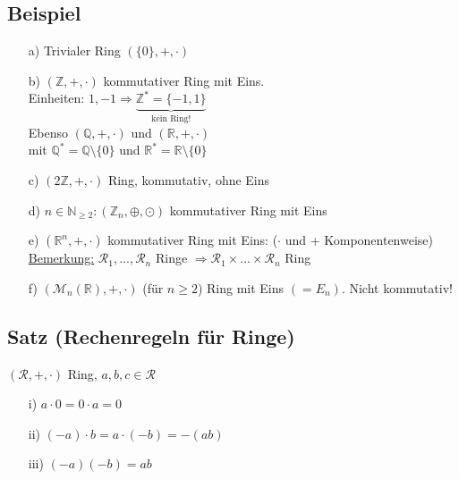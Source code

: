 \documentclass[a4paper, 12pt,titlepage, pdf, headsepline]{article}
\newcommand{\R}{\mathds{R}}
\newcommand{\uline}[1]{\underline{#1}}
\renewcommand{\>}{\rightarrow}
\renewcommand{\*}{\cdot}
\begin{document}
	      \subsection{Beispiel}
	      \label{4.2}
	      \begin{itemize}
	      	\item[a)] Trivialer Ring $(\{0\},+,\cdot)$
	      	\item[b)] $(\mathds{Z}, +,\cdot)$ kommutativer Ring mit Eins. \\
	      	      Einheiten: $1, -1\Rightarrow \underbrace{\mathds{Z}^* = \{-1,1\}}_{\text{kein Ring!}}$\\
	      	      Ebenso $(\mathds{Q},+,\cdot)$ und $(\mathds{R},+,\cdot)$ \\
	      	      mit $\mathds{Q}^* = \mathds{Q} \setminus \{0\}$ und $\mathds{R}^* =  \mathds{R} \setminus \{0\}$
	      	\item[c)] $(2\mathds{Z},+,\cdot)$ Ring, kommutativ, ohne Eins
	      	\item[d)] $n \in \mathds{N}_{\geq 2}: (\mathds{Z}_n, \oplus, \odot)$ kommutativer Ring mit Eins
	      	\item[e)] $(\R^n, + ,\cdot)$ kommutativer Ring mit Eins: ($\cdot$ und + Komponentenweise)\\
	      	      \uline{Bemerkung:} $\mathcal{R}_1,...,\mathcal{R}_n$ Ringe $\Rightarrow \mathcal{R}_1 \times ... \times \mathcal{R}_n$ Ring
	      	\item[f)] $(\mathcal{M}_n(\R),+, \cdot)$ (für $n\geq 2$) Ring mit Eins $(= E_n)$. Nicht kommutativ!
	      \end{itemize}
	      \subsection{Satz (Rechenregeln für Ringe)}
	      \label{4.3}
	      $(\mathcal{R}, +,\cdot)$ Ring, $a,b,c \in \mathcal{R}$
	      \begin{itemize}
	      	\item[i)] $a \cdot 0 = 0 \cdot a = 0$
	      	\item[ii)] $(-a) \cdot b = a \cdot (-b) = -(ab)$
	      	\item[iii)] $(-a)(-b) = ab$
	      \end{itemize}	
\end{document}
